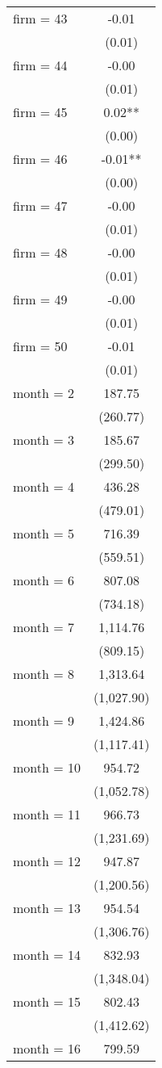 \begin{tabular}{lc}
firm = 43 & -0.01 \\
 & (0.01) \\
firm = 44 & -0.00 \\
 & (0.01) \\
firm = 45 & 0.02** \\
 & (0.00) \\
firm = 46 & -0.01** \\
 & (0.00) \\
firm = 47 & -0.00 \\
 & (0.01) \\
firm = 48 & -0.00 \\
 & (0.01) \\
firm = 49 & -0.00 \\
 & (0.01) \\
firm = 50 & -0.01 \\
 & (0.01) \\
month = 2 & 187.75 \\
 & (260.77) \\
month = 3 & 185.67 \\
 & (299.50) \\
month = 4 & 436.28 \\
 & (479.01) \\
month = 5 & 716.39 \\
 & (559.51) \\
month = 6 & 807.08 \\
 & (734.18) \\
month = 7 & 1,114.76 \\
 & (809.15) \\
month = 8 & 1,313.64 \\
 & (1,027.90) \\
month = 9 & 1,424.86 \\
 & (1,117.41) \\
month = 10 & 954.72 \\
 & (1,052.78) \\
month = 11 & 966.73 \\
 & (1,231.69) \\
month = 12 & 947.87 \\
 & (1,200.56) \\
month = 13 & 954.54 \\
 & (1,306.76) \\
month = 14 & 832.93 \\
 & (1,348.04) \\
month = 15 & 802.43 \\
 & (1,412.62) \\
month = 16 & 799.59 \\

\end{tabular}
